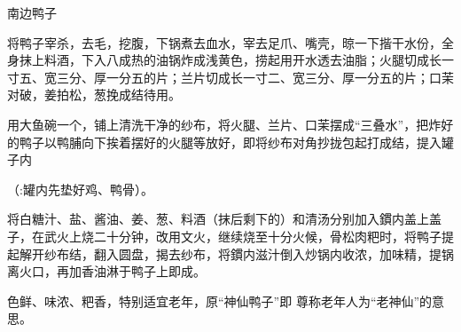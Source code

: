 \begin{recipe}[神仙鸭子]{南边鸭子}

\ingredients




\cooking

\step 将鸭子宰杀，去毛，挖腹，下锅煮去血水，宰去足爪、嘴壳，晾一下揩干水份，全身抹上料酒，下入八成热的油锅炸成浅黄色，捞起用开水透去油脂；火腿切成长一寸五、宽三分、厚一分五的片；兰片切成长一寸二、宽三分、厚一分五的片；口茉对破，姜拍松，葱挽成结待用。

\step 用大鱼碗一个，铺上清洗干净的纱布，将火腿、兰片、口茉摆成“三叠水”，把炸好的鸭子以鸭脯向下挨着摆好的火腿等放好，即将纱布对角抄拢包起打成结，提入罐子内

（:罐内先垫好鸡、鸭骨）。

\step 将白糖汁、盐、酱油、姜、葱、料酒（抹后剩下的）和清汤分别加入鏆内盖上盖子，在武火上烧二十分钟，改用文火，继续烧至十分火候，骨松肉粑时，将鸭子提起解开纱布结，翻入圆盘，揭去纱布，将鏆内滋汁倒入炒锅内收浓，加味精，提锅离火口，再加香油淋于鸭子上即成。

\notes

色鲜、味浓、粑香，特别适宜老年，原“神仙鸭子”即 尊称老年人为“老神仙”的意思。

\end{recipe}

